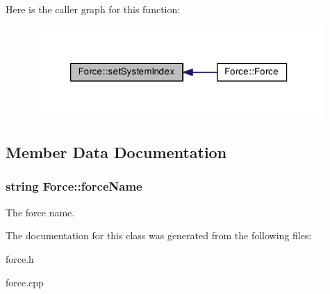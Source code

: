Here is the caller graph for this function\-:\nopagebreak
\begin{figure}[H]
\begin{center}
\leavevmode
\includegraphics[width=314pt]{class_force_aee052df1c632a6dfb323b5deac443684_icgraph}
\end{center}
\end{figure}




\subsection{Member Data Documentation}
\hypertarget{class_force_a50b8739b17f549bd250936b0251ca571}{
\subsubsection[{force\-Name}]{\setlength{\rightskip}{0pt plus 5cm}string Force\-::force\-Name\hspace{0.3cm}{\ttfamily [protected]}}}\label{class_force_a50b8739b17f549bd250936b0251ca571}
The force name. 

The documentation for this class was generated from the following files\-:\begin{DoxyCompactItemize}
\item 
force.\-h\item 
force.\-cpp\end{DoxyCompactItemize}
